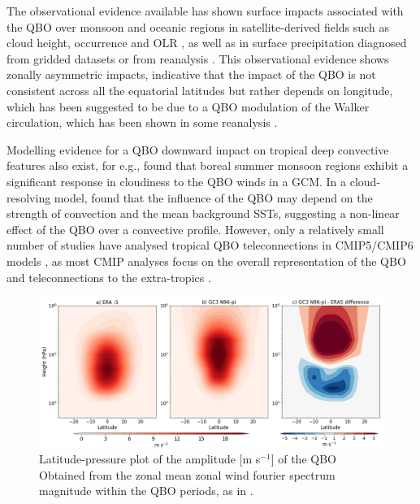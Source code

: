 The observational evidence available has shown surface impacts associated with the QBO over monsoon and oceanic regions in satellite-derived fields such as cloud height, occurrence and OLR \citep{collimore2003,liess2012}, as well as in surface precipitation diagnosed from gridded datasets or from reanalysis \citep{seo2013,gray2018}.
This observational evidence shows zonally asymmetric impacts, indicative that the impact of the QBO is not consistent across all the equatorial latitudes but rather depends on longitude, which has been suggested \citep[e.g. by][]{collimore2003,liess2012} to be due to a QBO modulation of the Walker circulation, which has been shown in some reanalysis \citep{yamazaki2020tropospheric,hitchman2021observational}.

Modelling evidence for a QBO downward impact on tropical deep convective features also exist, for e.g.,     \cite{giorgetta1999} found that boreal summer monsoon regions exhibit a significant response in cloudiness to the QBO winds in a GCM.
In a cloud-resolving model, \cite{nie2015} found that the influence of the QBO may depend on the strength of convection and the mean background SSTs, suggesting a non-linear effect of the QBO over a convective profile.
However, only a relatively small number of studies have analysed tropical QBO teleconnections in CMIP5/CMIP6 models \citep{serva2021}, as most CMIP analyses focus on the overall representation of the QBO and teleconnections to the extra-tropics  \citep{richter2020,anstey2021}.
 
 
\begin{figure}[t!]
\centering
 \includegraphics[width=\linewidth]{figures/qboamplitude.png}
\caption[QBO amplitude bias]{Latitude-pressure plot of the amplitude [m s$^{-1}$] of the QBO  Obtained from the zonal mean zonal wind fourier spectrum magnitude within the QBO periods, as in \cite{schenzinger2017}. }
\label{fig:qboamplitude}
\end{figure} 


